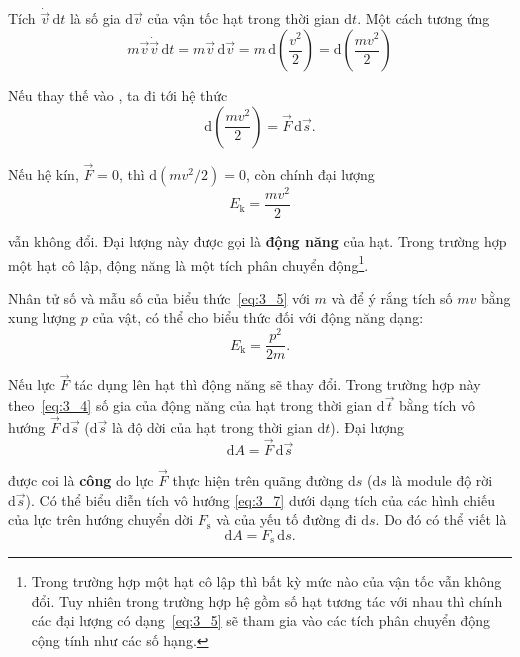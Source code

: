 \noindent
Tích $\dot{\vec{v}}\,\mathrm{d}t$ là số gia $\mathrm{d}\vec{v}$ của vận tốc hạt trong thời gian $\mathrm{d}t$. Một cách tương ứng
\begin{equation}\label{eq:3_3}
m\vec{v}\dot{\vec{v}}\,\mathrm{d}t = m\vec{v}\,\mathrm{d}\vec{v} = m\,\mathrm{d}\!\left(\frac{v^2}{2}\right) = \mathrm{d}\!\left(\frac{mv^2}{2}\right)
\end{equation}

\noindent
Nếu thay thế vào , ta đi tới hệ thức
\begin{equation}\label{eq:3_4}
\mathrm{d}\!\left(\frac{mv^2}{2}\right) = \vec{F}\,\mathrm{d}\vec{s}.
\end{equation}

\noindent
Nếu hệ kín, $\vec{F}=0$, thì $\mathrm{d}(mv^2/2)=0$, còn chính đại lượng
\begin{equation}\label{eq:3_5}
E_{\text{k}} = \frac{mv^2}{2}
\end{equation}

\noindent
vẫn không đổi. Đại lượng này được gọi là \textbf{động năng} của hạt. Trong trường hợp một hạt cô lập, động năng là một tích phân chuyển động\footnote{Trong trường hợp một hạt cô lập thì bất kỳ mức nào của vận tốc vẫn không đổi. Tuy nhiên trong trường hợp hệ gồm số hạt tương tác với nhau thì chính các đại lượng có dạng~\eqref{eq:3_5} sẽ tham gia vào các tích phân chuyển động cộng tính như các số hạng. }.

Nhân tử số và mẫu số của biểu thức~\eqref{eq:3_5} với $m$ và để ý rắng tích số $mv$ bằng xung lượng $p$ của vật, có thể cho biểu thức đối với động năng dạng:
\begin{equation}\label{eq:3_6}
E_{\text{k}} = \frac{p^2}{2m}.
\end{equation}

\noindent
Nếu lực $\vec{F}$ tác dụng lên hạt thì động năng sẽ thay đổi. Trong trường hợp này theo~\eqref{eq:3_4} số gia của động năng của hạt trong thời gian $\mathrm{d}\vec{t}$ bằng tích vô hướng $\vec{F}\,\mathrm{d}\vec{s}$ ($\mathrm{d}\vec{s}$ là độ dời của hạt trong thời gian $\mathrm{d}t$). Đại lượng 
\begin{equation}\label{eq:3_7}
\mathrm{d}A = \vec{F}\,\mathrm{d}\vec{s}
\end{equation}

\noindent
được coi là \textbf{công} do lực $\vec{F}$ thực hiện trên quãng đường $\mathrm{d}s$ ($\mathrm{d}s$ là module độ rời $\mathrm{d}\vec{s}$). Có thể biểu diễn tích vô hướng \eqref{eq:3_7} dưới dạng tích của các hình chiếu của lực trên hướng chuyển dời $F_{\text{s}}$ và của yếu tố đường đi $\mathrm{d}s$. Do đó có thể viết là 
\begin{equation}\label{eq:3_8}
\mathrm{d}A = F_{\text{s}}\,\mathrm{d}s.
\end{equation}

